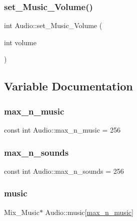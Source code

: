 \subsubsection{\texorpdfstring{set\+\_\+\+Music\+\_\+\+Volume()}{set\_Music\_Volume()}}
{\footnotesize\ttfamily int Audio\+::set\+\_\+\+Music\+\_\+\+Volume (\begin{DoxyParamCaption}\item[{int}]{volume }\end{DoxyParamCaption})}



\subsection{Variable Documentation}
\mbox{\label{namespace_audio_aa91efb37b561b15ba9999f2e7e4dce8f}} 
\subsubsection{\texorpdfstring{max\+\_\+n\+\_\+music}{max\_n\_music}}
{\footnotesize\ttfamily const int Audio\+::max\+\_\+n\+\_\+music = 256}

\mbox{\label{namespace_audio_a0f535450e240117fb4fcaa86c1cc99c7}} 
\subsubsection{\texorpdfstring{max\+\_\+n\+\_\+sounds}{max\_n\_sounds}}
{\footnotesize\ttfamily const int Audio\+::max\+\_\+n\+\_\+sounds = 256}

\mbox{\label{namespace_audio_adffea44d4332af6d5b77e977b0012bfc}} 
\subsubsection{\texorpdfstring{music}{music}}
{\footnotesize\ttfamily Mix\+\_\+\+Music$\ast$ Audio\+::music\mbox{[}\mbox{\hyperlink{namespace_audio_aa91efb37b561b15ba9999f2e7e4dce8f}{max\+\_\+n\+\_\+music}}\mbox{]}}

